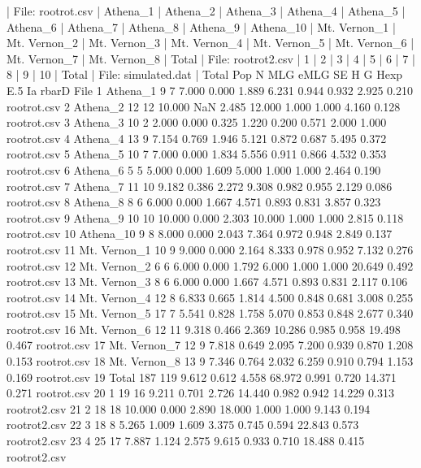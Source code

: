 \documentclass[letterpaper]{article}
\begin{document}
\begin{Schunk}
\begin{Soutput}
| File:  rootrot.csv 
| Athena_1 
| Athena_2 
| Athena_3 
| Athena_4 
| Athena_5 
| Athena_6 
| Athena_7 
| Athena_8 
| Athena_9 
| Athena_10 
| Mt. Vernon_1 
| Mt. Vernon_2 
| Mt. Vernon_3 
| Mt. Vernon_4 
| Mt. Vernon_5 
| Mt. Vernon_6 
| Mt. Vernon_7 
| Mt. Vernon_8 
| Total 
| File:  rootrot2.csv 
| 1 
| 2 
| 3 
| 4 
| 5 
| 6 
| 7 
| 8 
| 9 
| 10 
| Total 
| File:  simulated.dat 
| Total 
            Pop   N MLG   eMLG    SE     H      G  Hexp   E.5     Ia rbarD          File
1      Athena_1   9   7  7.000 0.000 1.889  6.231 0.944 0.932  2.925 0.210   rootrot.csv
2      Athena_2  12  12 10.000   NaN 2.485 12.000 1.000 1.000  4.160 0.128   rootrot.csv
3      Athena_3  10   2  2.000 0.000 0.325  1.220 0.200 0.571  2.000 1.000   rootrot.csv
4      Athena_4  13   9  7.154 0.769 1.946  5.121 0.872 0.687  5.495 0.372   rootrot.csv
5      Athena_5  10   7  7.000 0.000 1.834  5.556 0.911 0.866  4.532 0.353   rootrot.csv
6      Athena_6   5   5  5.000 0.000 1.609  5.000 1.000 1.000  2.464 0.190   rootrot.csv
7      Athena_7  11  10  9.182 0.386 2.272  9.308 0.982 0.955  2.129 0.086   rootrot.csv
8      Athena_8   8   6  6.000 0.000 1.667  4.571 0.893 0.831  3.857 0.323   rootrot.csv
9      Athena_9  10  10 10.000 0.000 2.303 10.000 1.000 1.000  2.815 0.118   rootrot.csv
10    Athena_10   9   8  8.000 0.000 2.043  7.364 0.972 0.948  2.849 0.137   rootrot.csv
11 Mt. Vernon_1  10   9  9.000 0.000 2.164  8.333 0.978 0.952  7.132 0.276   rootrot.csv
12 Mt. Vernon_2   6   6  6.000 0.000 1.792  6.000 1.000 1.000 20.649 0.492   rootrot.csv
13 Mt. Vernon_3   8   6  6.000 0.000 1.667  4.571 0.893 0.831  2.117 0.106   rootrot.csv
14 Mt. Vernon_4  12   8  6.833 0.665 1.814  4.500 0.848 0.681  3.008 0.255   rootrot.csv
15 Mt. Vernon_5  17   7  5.541 0.828 1.758  5.070 0.853 0.848  2.677 0.340   rootrot.csv
16 Mt. Vernon_6  12  11  9.318 0.466 2.369 10.286 0.985 0.958 19.498 0.467   rootrot.csv
17 Mt. Vernon_7  12   9  7.818 0.649 2.095  7.200 0.939 0.870  1.208 0.153   rootrot.csv
18 Mt. Vernon_8  13   9  7.346 0.764 2.032  6.259 0.910 0.794  1.153 0.169   rootrot.csv
19        Total 187 119  9.612 0.612 4.558 68.972 0.991 0.720 14.371 0.271   rootrot.csv
20            1  19  16  9.211 0.701 2.726 14.440 0.982 0.942 14.229 0.313  rootrot2.csv
21            2  18  18 10.000 0.000 2.890 18.000 1.000 1.000  9.143 0.194  rootrot2.csv
22            3  18   8  5.265 1.009 1.609  3.375 0.745 0.594 22.843 0.573  rootrot2.csv
23            4  25  17  7.887 1.124 2.575  9.615 0.933 0.710 18.488 0.415  rootrot2.csv

\end{Soutput}
\end{Schunk}
\end{document}
